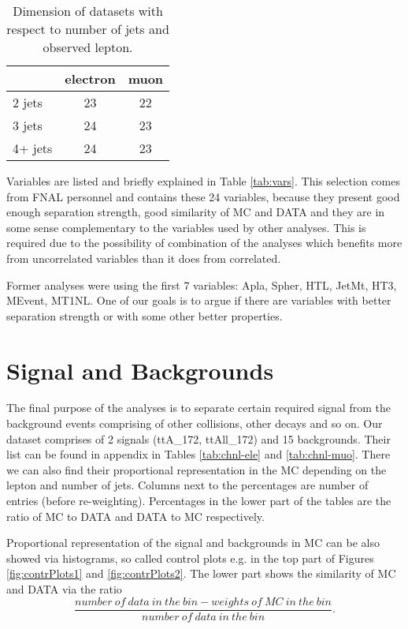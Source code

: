 \begin{table}[htb]
\caption{Dimension of datasets with respect to number of jets and observed lepton.}
\centering
\begin{tabular}{|l|c|c|}
\hline 
 & electron & muon \\ 
\hline 
2 jets & 23 & 22 \\ 
\hline 
3 jets & 24 & 23 \\ 
\hline 
4+ jets & 24 & 23 \\ 
\hline 
\end{tabular} 
\label{tab:data-dims}
\end{table}

Variables are listed and briefly explained in Table \ref{tab:vars}. This selection comes from  FNAL personnel and contains these 24 variables, because they present good enough separation strength, good similarity of MC and DATA and they are in some sense complementary to the variables used by other analyses. This is required due to the possibility of combination of the analyses which benefits more from uncorrelated variables than it does from correlated. 

Former analyses were using the first 7 variables: \textsf{Apla, Spher, HTL, JetMt, HT3, MEvent, MT1NL}. One of our goals is to argue if there are variables with better separation strength or with some other better properties. 

\section{Signal and Backgrounds}


The final purpose of the analyses is to separate certain required signal from the background events comprising of other collisions, other decays and so on. Our dataset comprises of 2 signals (\textsf{ttA\_172, ttAll\_172}) and 15 backgrounds. Their list can be found in appendix in Tables \ref{tab:chnl-ele} and \ref{tab:chnl-muo}. There we can also find their proportional representation in the MC depending on the lepton and number of jets. Columns next to the percentages are number of entries (before re-weighting). Percentages in the lower part of the tables are the ratio of MC to DATA and DATA to MC respectively.







Proportional representation of the signal and backgrounds in MC can be also showed via histograms, so called control plots e.g. in the top part of Figures  \ref{fig:contrPlots1} and \ref{fig:contrPlots2}. The lower part shows the similarity of MC and DATA via the ratio
\begin{equation*}
\frac{number\:of\:data\:in\:the\:bin - weights\:of\:MC\:in\:the\:bin}{number\:of\:data\:in\:the\:bin}.
\end{equation*}

